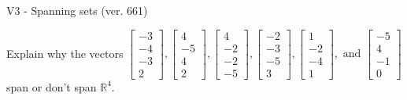 \begin{exercise}
  \begin{exerciseTitle}V3 - Spanning sets (ver. 661)\end{exerciseTitle}
  \begin{exerciseStatement}
    Explain why the vectors \(\left[\begin{array}{r}
-3 \\
-4 \\
-3 \\
2
\end{array}\right] , \left[\begin{array}{r}
4 \\
-5 \\
4 \\
2
\end{array}\right] , \left[\begin{array}{r}
4 \\
-2 \\
-2 \\
-5
\end{array}\right] , \left[\begin{array}{r}
-2 \\
-3 \\
-5 \\
3
\end{array}\right] , \left[\begin{array}{r}
1 \\
-2 \\
-4 \\
1
\end{array}\right] , \text{ and } \left[\begin{array}{r}
-5 \\
4 \\
-1 \\
0
\end{array}\right]\) span or don't span \(\mathbb{R}^4\). 
	



\end{exerciseStatement}
\end{exercise}
